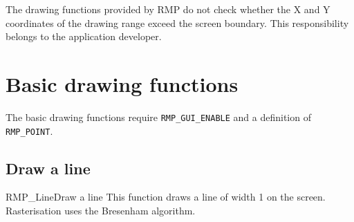 The drawing functions provided by RMP do not check whether the X and Y coordinates of the drawing range exceed the screen boundary.
This responsibility belongs to the application developer.

\section{Basic drawing functions}

The basic drawing functions require \texttt{RMP\_GUI\_ENABLE} and a definition of \texttt{RMP\_POINT}.

\subsection{Draw a line}
\begin{apidesc}{RMP\_Line}{Draw a line}\label{api:RMP_Line}
    This function draws a line of width 1 on the screen.
    Rasterisation uses the Bresenham algorithm.
    \begin{apiparams}
    \end{apiparams}
    \begin{apiret}
    \end{apiret}
\end{apidesc}

